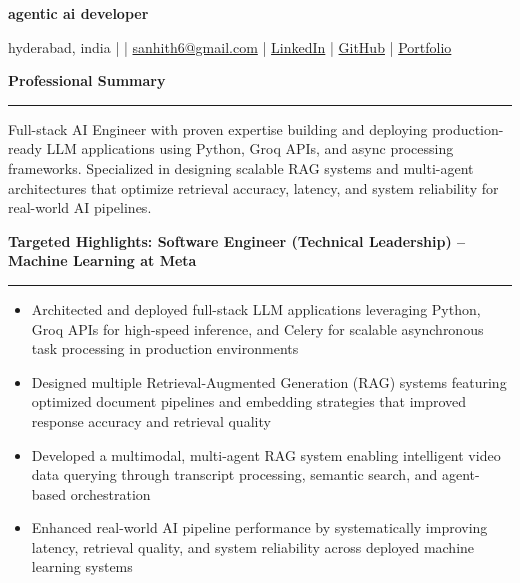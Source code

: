 \documentclass[9pt, letterpaper]{article}
\newcommand{\name}[1]{%
    \begin{center}
        {\LARGE \textbf{#1}}
    \end{center}
}
\newcommand{\sectionheading}[1]{%
    \vspace{4pt}%
    {\large \textbf{#1}}%
    \vspace{1pt}%
    \hrule
    \vspace{2pt}%
}
\begin{document}
\name{agentic ai developer}
\begin{center}
    hyderabad, india \quad |  \quad | \quad
    \href{mailto:sanhith6@gmail.com}{sanhith6@gmail.com} \quad | \quad
    \href{https://www.linkedin.com/in/sanhith-reddy-740a1625b/}{LinkedIn} \quad | \quad
    \href{https://github.com/tsanhith}{GitHub} \quad | \quad
    \href{https://johndoe.dev}{Portfolio}
\end{center}

\vspace{0pt}

\sectionheading{Professional Summary}
Full-stack AI Engineer with proven expertise building and deploying production-ready LLM applications using Python, Groq APIs, and async processing frameworks. Specialized in designing scalable RAG systems and multi-agent architectures that optimize retrieval accuracy, latency, and system reliability for real-world AI pipelines.

\sectionheading{Targeted Highlights: Software Engineer (Technical Leadership) – Machine Learning at Meta}
\begin{itemize}[leftmargin=0.25in, itemindent=-0.15in, label={--}]
    \item Architected and deployed full-stack LLM applications leveraging Python, Groq APIs for high-speed inference, and Celery for scalable asynchronous task processing in production environments
    \item Designed multiple Retrieval-Augmented Generation (RAG) systems featuring optimized document pipelines and embedding strategies that improved response accuracy and retrieval quality
    \item Developed a multimodal, multi-agent RAG system enabling intelligent video data querying through transcript processing, semantic search, and agent-based orchestration
    \item Enhanced real-world AI pipeline performance by systematically improving latency, retrieval quality, and system reliability across deployed machine learning systems
\end{itemize}
\end{document}
